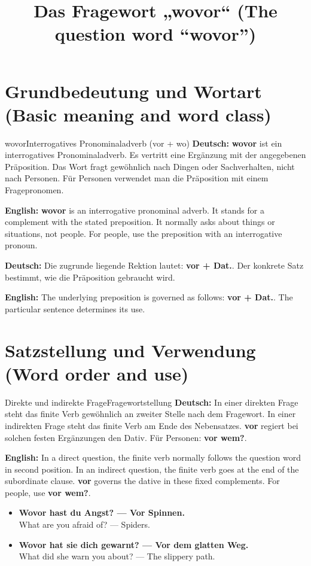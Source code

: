 \documentclass[a4paper,11pt]{article}
\title{Das Fragewort „wovor“ (The question word “wovor”)}
\date{}
\newcommand{\GermanText}[1]{\textbf{Deutsch: }#1\par}
\newcommand{\EnglishText}[1]{{\small\color{SoftGray}\textbf{English: }#1\par}}
\newcommand{\ExampleItem}[2]{\item \textbf{#1}\\{\small\color{SoftGray}#2}}
\begin{document}
\maketitle
\tableofcontents
\newpage
\section{Grundbedeutung und Wortart (Basic meaning and word class)}
\begin{grammarentry}{wovor}{Interrogatives Pronominaladverb (vor + wo)}
\GermanText{\textbf{wovor} ist ein interrogatives Pronominaladverb. Es vertritt eine Ergänzung mit der angegebenen Präposition. Das Wort fragt gewöhnlich nach Dingen oder Sachverhalten, nicht nach Personen. Für Personen verwendet man die Präposition mit einem Fragepronomen.}
\EnglishText{\textbf{wovor} is an interrogative pronominal adverb. It stands for a complement with the stated preposition. It normally asks about things or situations, not people. For people, use the preposition with an interrogative pronoun.}
\GermanText{Die zugrunde liegende Rektion lautet: \textbf{vor + Dat.}. Der konkrete Satz bestimmt, wie die Präposition gebraucht wird.}
\EnglishText{The underlying preposition is governed as follows: \textbf{vor + Dat.}. The particular sentence determines its use.}
\end{grammarentry}
\section{Satzstellung und Verwendung (Word order and use)}
\begin{grammarentry}{Direkte und indirekte Frage}{Fragewortstellung}
\GermanText{In einer direkten Frage steht das finite Verb gewöhnlich an zweiter Stelle nach dem Fragewort. In einer indirekten Frage steht das finite Verb am Ende des Nebensatzes. \textbf{vor} regiert bei solchen festen Ergänzungen den Dativ. Für Personen: \textbf{vor wem?}.}
\EnglishText{In a direct question, the finite verb normally follows the question word in second position. In an indirect question, the finite verb goes at the end of the subordinate clause. \textbf{vor} governs the dative in these fixed complements. For people, use \textbf{vor wem?}.}
\end{grammarentry}
\begin{exbox}\begin{itemize}
\ExampleItem{Wovor hast du Angst? — Vor Spinnen.}{What are you afraid of? — Spiders.}
\ExampleItem{Wovor hat sie dich gewarnt? — Vor dem glatten Weg.}{What did she warn you about? — The slippery path.}
\end{itemize}\end{exbox}
\end{document}
